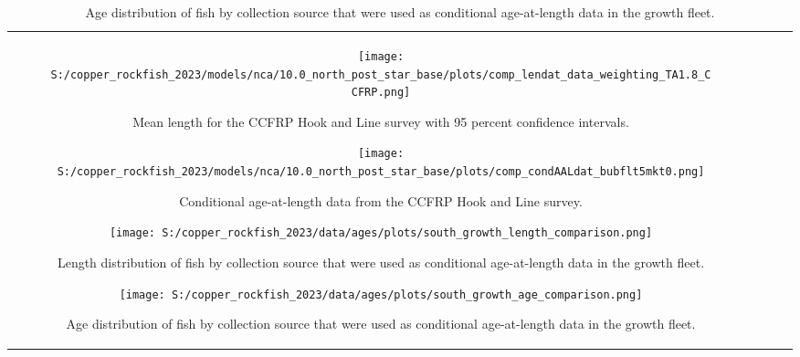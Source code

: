 \documentclass[11pt,
  letterpaper,
]{article}
\begin{document}
\begin{longtable}[t]{c>{\centering\arraybackslash}p{2cm}>{\centering\arraybackslash}p{2cm}>{\centering\arraybackslash}p{2cm}}
\pagebreak

\begin{figure}
{\centering
\texttt{[image: S:/copper\_rockfish\_2023/models/nca/10.0\_north\_post\_star\_base/plots/comp\_lendat\_data\_weighting\_TA1.8\_CCFRP.png]}
}
\caption{Mean length for the CCFRP Hook and Line survey with 95 percent confidence intervals.\label{fig:ccfrp-mean-len-data}}
\end{figure}

\pagebreak

\begin{figure}
{\centering
\texttt{[image: S:/copper\_rockfish\_2023/models/nca/10.0\_north\_post\_star\_base/plots/comp\_condAALdat\_bubflt5mkt0.png]}
}
\caption{Conditional age-at-length data from the CCFRP Hook and Line survey.\label{fig:ccfrp-age-data}}
\end{figure}

\pagebreak

\pagebreak

\pagebreak

\pagebreak

\pagebreak

\pagebreak

\pagebreak

\begin{figure}
{\centering
\texttt{[image: S:/copper\_rockfish\_2023/data/ages/plots/south\_growth\_length\_comparison.png]}
}
\caption{Length distribution of fish by collection source that were used as conditional age-at-length data in the growth fleet.\label{fig:growth-len-dist}}
\end{figure}

\pagebreak

\begin{figure}
{\centering
\texttt{[image: S:/copper\_rockfish\_2023/data/ages/plots/south\_growth\_age\_comparison.png]}
}
\caption{Age distribution of fish by collection source that were used as conditional age-at-length data in the growth fleet.\label{fig:growth-age-dist}}
\end{figure}


\end{longtable}
\end{document}
